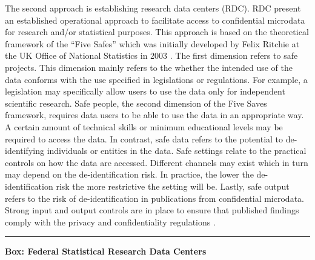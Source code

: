 \documentclass[]{krantz}
\begin{document}
The second approach is establishing research data centers (RDC). RDC
present an established operational approach to facilitate access to
confidential microdata for research and/or statistical purposes. This
approach is based on the theoretical framework of the ``Five Safes''
which was initially developed by Felix Ritchie at the UK Office of
National Statistics in 2003 \citep{desaietal2016}. The first dimension
refers to safe projects. This dimension mainly refers to the whether the
intended use of the data conforms with the use specified in legislations
or regulations. For example, a legislation may specifically allow users
to use the data only for independent scientific research. Safe people,
the second dimension of the Five Saves framework, requires data users to
be able to use the data in an appropriate way. A certain amount of
technical skills or minimum educational levels may be required to access
the data. In contrast, safe data refers to the potential to
de-identifying individuals or entities in the data. Safe settings relate
to the practical controls on how the data are accessed. Different
channels may exist which in turn may depend on the de-identification
risk. In practice, the lower the de-identification risk the more
restrictive the setting will be. Lastly, safe output refers to the risk
of de-identification in publications from confidential microdata. Strong
input and output controls are in place to ensure that published findings
comply with the privacy and confidentiality regulations
\citep{hayden2012broken}.

\begin{center}\rule{0.5\linewidth}{\linethickness}\end{center}

\textbf{Box: Federal Statistical Research Data Centers}
\end{document}
